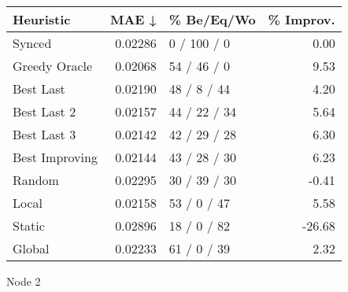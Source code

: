 \begin{tabular}{lrlr}
\toprule
\textbf{Heuristic} & \textbf{MAE ↓} & \textbf{\% Be/Eq/Wo} & \textbf{\% Improv.} \\
\midrule
            Synced &        0.02286 &          0 / 100 / 0 &                0.00 \\
     Greedy Oracle &        0.02068 &          54 / 46 / 0 &                9.53 \\
         Best Last &        0.02190 &          48 / 8 / 44 &                4.20 \\
       Best Last 2 &        0.02157 &         44 / 22 / 34 &                5.64 \\
       Best Last 3 &        0.02142 &         42 / 29 / 28 &                6.30 \\
    Best Improving &        0.02144 &         43 / 28 / 30 &                6.23 \\
            Random &        0.02295 &         30 / 39 / 30 &               -0.41 \\
             Local &        0.02158 &          53 / 0 / 47 &                5.58 \\
            Static &        0.02896 &          18 / 0 / 82 &              -26.68 \\
            Global &        0.02233 &          61 / 0 / 39 &                2.32 \\
\bottomrule
\end{tabular}
\caption{Node 2}
\label{tab:non_lr01_le2_bs2_2}
